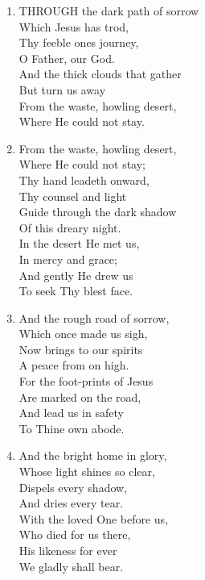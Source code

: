 \begin{enumerate}
    \item THROUGH the dark path of sorrow \\
        Which Jesus has trod, \\
        Thy feeble ones journey, \\
        O Father, our God. \\
        And the thick clouds that gather \\
        But turn us away \\
        From the waste, howling desert, \\
        Where He could not stay.

    \item From the waste, howling desert, \\
        Where He could not stay; \\
        Thy hand leadeth onward, \\
        Thy counsel and light \\
        Guide through the dark shadow \\
        Of this dreary night. \\
        In the desert He met us, \\
        In mercy and grace; \\
        And gently He drew us \\
        To seek Thy blest face.

    \item And the rough road of sorrow, \\
        Which once made us sigh, \\
        Now brings to our spirits \\
        A peace from on high. \\
        For the foot-prints of Jesus \\
        Are marked on the road, \\
        And lead us in safety \\
        To Thine own abode.

    \item And the bright home in glory, \\
        Whose light shines so clear, \\
        Dispels every shadow, \\
        And dries every tear. \\
        With the loved One before us, \\
        Who died for us there, \\
        His likeness for ever \\
        We gladly shall bear.


\end{enumerate}
